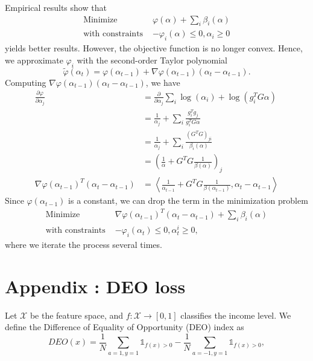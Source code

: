 \documentclass{article}
\newcommand{\mc}[1]{\mathcal{#1}}
\renewcommand{\|}{\biggr|}
\begin{document}
    Empirical results show that
    \begin{align*}
    \text{Minimize } & \varphi(\alpha) + \sum_i \beta_i(\alpha) \\
    \text{with constraints } & -\varphi_i(\alpha) \leq 0, \alpha_i \geq 0
    \end{align*}
    yields better results. However, the objective function is no longer convex. Hence, we approximate $\varphi_i$ with the second-order Taylor polynomial
    \begin{equation*}
    \tilde{\varphi}(\alpha_t) = \varphi(\alpha_{t-1}) + \nabla \varphi(\alpha_{t-1})(\alpha_t - \alpha_{t-1}).
    \end{equation*}
    Computing $\nabla \varphi(\alpha_{t-1})(\alpha_t - \alpha_{t-1})$, we have
    \begin{align*}
    \frac{\partial \varphi}{\partial \alpha_j} &= \frac{\partial}{\partial \alpha_j} \sum_i \log(\alpha_i) + \log(g_i^T G \alpha) \\
    &= \frac{1}{\alpha_j} + \sum_i \frac{g_i^T g_j}{g_i^T G \alpha} \\
    &= \frac{1}{\alpha_j} + \sum_i \frac{(G^T G)_{ji}}{\beta_i(\alpha)} \\
    &= \left( \frac{1}{\alpha} + G^T G \frac{1}{\beta(\alpha)} \right)_j \\
    \nabla \varphi(\alpha_{t-1})^T (\alpha_t - \alpha_{t-1}) &= \left\langle \frac{1}{\alpha_{t-1}} + G^T G \frac{1}{\beta(\alpha_{t-1})}, \alpha_t - \alpha_{t-1} \right\rangle
    \end{align*}
    Since $\varphi(\alpha_{t-1})$ is a constant, we can drop the term in the minimization problem
    \begin{align*}
    \text{Minimize } & \nabla \varphi(\alpha_{t-1})^T (\alpha_t - \alpha_{t-1}) + \sum_i \beta_i(\alpha) \\
    \text{with constraints } & -\varphi_i(\alpha_t) \leq 0, \alpha_t^i \geq 0,
    \end{align*}
    where we iterate the process several times.
  
   


    \section{Appendix : DEO loss}

    Let $\mc X$ be the feature space, and $f:\mc X\to [0,1]$ classifies the income level. We define the Difference of Equality of Opportunity (DEO) index as 
    \begin{equation*}
        DEO(x) = \frac{1}{N}\sum_{a = 1, y= 1}\mathbb 1_{f(x) > 0} - \frac{1}{N}\sum_{a =  -1, y= 1}\mathbb 1_{f(x) > 0},
    \end{equation*}
\end{document}
